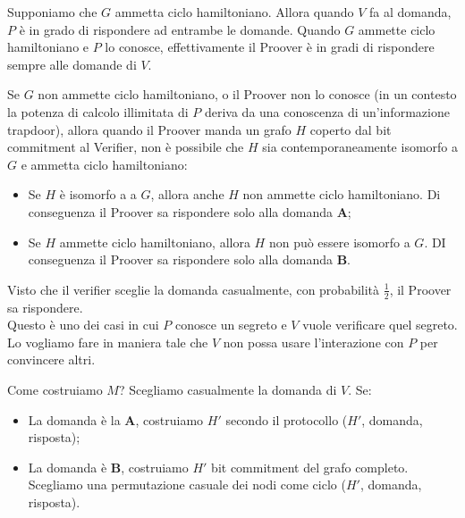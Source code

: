 \noindent Supponiamo che $G$ ammetta ciclo hamiltoniano. Allora quando $V$ fa al domanda, $P$ è in grado di rispondere ad entrambe le domande. Quando $G$ ammette ciclo hamiltoniano e $P$ lo conosce, effettivamente il Proover è in gradi di rispondere sempre alle domande di $V$.

Se $G$ non ammette ciclo hamiltoniano, o il Proover non lo conosce (in un contesto la potenza di calcolo illimitata di $P$ deriva da una conoscenza di un'informazione trapdoor), allora quando il Proover manda un grafo $H$ coperto dal bit commitment al Verifier, non è possibile che $H$ sia contemporaneamente isomorfo a $G$ e ammetta ciclo hamiltoniano: 
\begin{itemize}
    \item Se $H$ è isomorfo a a $G$, allora anche $H$ non ammette ciclo hamiltoniano. Di conseguenza il Proover sa rispondere solo alla domanda \textbf{A};
    \item Se $H$ ammette ciclo hamiltoniano, allora $H$ non può essere isomorfo a $G$. DI conseguenza il Proover sa rispondere solo alla domanda \textbf{B}.
\end{itemize}

\noindent Visto che il verifier sceglie la domanda casualmente, con probabilità $\frac{1}{2}$, il Proover sa rispondere. 
\\

\noindent Questo è uno dei casi in cui $P$ conosce un segreto e $V$ vuole verificare quel segreto. Lo vogliamo fare in maniera tale che $V$ non possa usare l'interazione con $P$ per convincere altri. 

Come costruiamo $M$? Scegliamo casualmente la domanda di $V$. Se:
    \begin{itemize}
        \item La domanda è la \textbf{A}, costruiamo $H'$ secondo il protocollo ($H'$, domanda, risposta);
        \item La domanda è \textbf{B}, costruiamo $H'$ bit commitment del grafo completo. Scegliamo una permutazione casuale dei nodi come ciclo ($H'$, domanda, risposta).
    \end{itemize}

